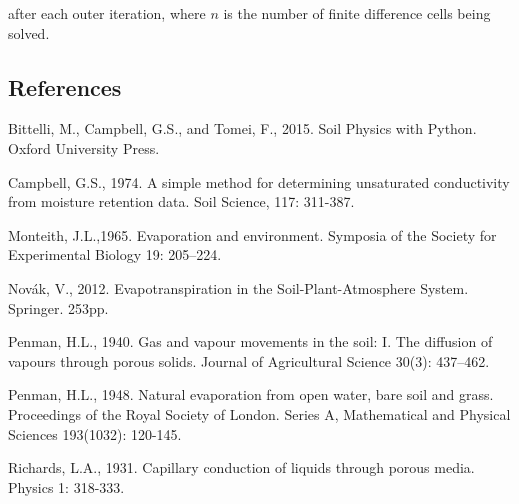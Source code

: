\documentclass[10pt, letterpapr]{article}
\begin{document}
\noindent after each outer iteration, where $n$ is the number of finite difference cells being solved.

\newpage
\subsection*{References}

Bittelli, M., Campbell, G.S., and Tomei, F., 2015. Soil Physics with Python. Oxford University Press.

Campbell, G.S., 1974. A simple method for determining unsaturated conductivity from moisture retention data. Soil Science, 117: 311-387.

Monteith, J.L.,1965. Evaporation and environment. Symposia of the Society for Experimental Biology 19: 205–224.

Nov\'ak, V., 2012. Evapotranspiration in the Soil-Plant-Atmosphere System. Springer. 253pp.

Penman, H.L., 1940. Gas and vapour movements in the soil: I. The diffusion of vapours through porous solids. Journal of Agricultural Science 30(3): 437--462.

Penman, H.L., 1948. Natural evaporation from open water, bare soil and grass. Proceedings of the Royal Society of London. Series A, Mathematical and Physical Sciences 193(1032): 120-145.

Richards, L.A., 1931. Capillary conduction of liquids through porous media. Physics 1: 318-333.
\end{document}
